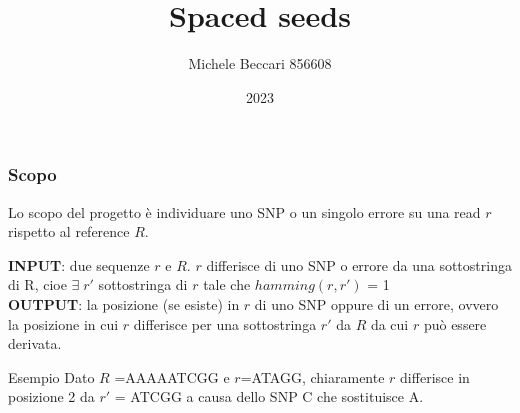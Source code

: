 \documentclass[
	11pt, %
]{beamer}
\title[Spaced seeds]{Spaced seeds} %
\author{Michele Beccari 856608} %
\institute[]{Corso di Bioinformatica} %
\date[2023]{2023} %
\begin{document}

\begin{frame}
	\titlepage %
\end{frame}



\begin{frame}
	\frametitle{Scopo} %
	
	Lo scopo del progetto è individuare uno SNP o un singolo errore su una read $r$ rispetto al reference $R$.
	
\begin{block}{}
		\textbf{INPUT}: due sequenze $r$ e $R$.
		$r$ differisce di uno SNP o errore da una sottostringa di R, cioe $\exists \; r'$ sottostringa di $r$ tale che $hamming(r, r')$ = 1 \\
		\bigskip
		\textbf{OUTPUT}: la posizione (se esiste) in $r$ di uno SNP oppure di un errore, ovvero la posizione in cui $r$ differisce per una sottostringa $r'$ da $R$ da cui $r$ può essere derivata. 

\end{block}
\begin{exampleblock}{Esempio}
Dato $R$ =AAAAATCGG e $r$=ATAGG, chiaramente $r$ differisce in posizione 2 da $r'$ = ATCGG a causa dello SNP C che sostituisce A.
\end{exampleblock}
\end{frame}
\end{document}

